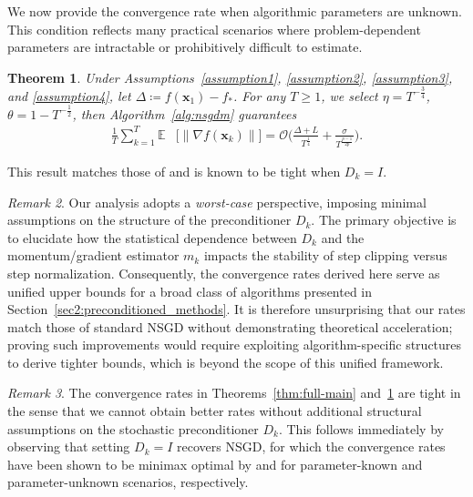\documentclass{article}
\newcommand{\bx}{\boldsymbol{x}}
\theoremstyle{plain}
\newtheorem{theorem}{Theorem}[section]
\theoremstyle{definition}
\theoremstyle{remark}
\newtheorem{remark}[theorem]{Remark}
\begin{document}
We now provide the convergence rate when algorithmic parameters are unknown. This condition reflects many practical scenarios where problem-dependent parameters are intractable or prohibitively difficult to estimate. 

\begin{theorem}\label{thm:none-main}
Under Assumptions~\ref{assumption1}, \ref{assumption2}, \ref{assumption3}, and \ref{assumption4}, let $\Delta \coloneqq f(\bx_1) - f_*$. For any $T \geq 1$, we select $\eta= 
    T^{-\frac{3}{4}}$, $\theta = 1 - T^{-\frac{1}{2}}$, then 
Algorithm~\ref{alg:nsgdm} guarantees
\begin{align}\label{thm1:main-bound}
\frac{1}{T}  \sum_{k=1}^T \mathbb{E} & \bigl[ \|\nabla f(\bx_k)\| \bigr]
 = \mathcal{O} \Biggl( 
    \frac{\Delta + L}{T^{\frac{1}{4}}}  + \frac{ \sigma }{T^{\frac{p-1}{2p}}}
\Biggr).
\end{align}
\end{theorem}


This result matches those of \citet{Hubler2024Gradient,Liu2025Nonconvex} and is known to be tight when $D_k=I$.

\begin{remark}
Our analysis adopts a \textit{worst-case} perspective, imposing minimal assumptions on the structure of the preconditioner $D_k$. The primary objective is to elucidate how the statistical dependence between $D_k$ and the momentum/gradient estimator $m_k$ impacts the stability of step clipping versus step normalization. Consequently, the convergence rates derived here serve as unified upper bounds for a broad class of algorithms presented in Section~\ref{sec2:preconditioned_methods}. It is therefore unsurprising that our rates match those of standard NSGD without demonstrating theoretical acceleration; proving such improvements would require exploiting algorithm-specific structures to derive tighter bounds, which is beyond the scope of this unified framework.
\end{remark}

\begin{remark}
The convergence rates in Theorems~\ref{thm:full-main} and~\ref{thm:none-main} are tight in the sense that we cannot obtain better rates without additional structural assumptions on the stochastic preconditioner $D_k$. This follows immediately by observing that setting $D_k=I$ recovers NSGD, for which the convergence rates have been shown to be minimax optimal by \cite{Liu2025Nonconvex} and \cite{Hubler2024Gradient} for parameter-known and parameter-unknown scenarios, respectively.
\end{remark}
\end{document}
